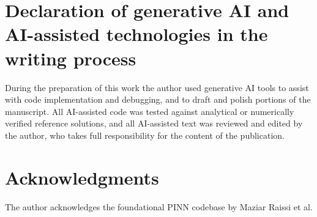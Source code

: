 \documentclass[a4paper,fleqn]{cas-sc}
\begin{document}
\section*{Declaration of generative AI and AI-assisted technologies in the writing process}

During the preparation of this work the author used generative AI tools to
assist with code implementation and debugging, and to draft and polish
portions of the manuscript. All AI-assisted code was tested against analytical
or numerically verified reference solutions, and all AI-assisted text was
reviewed and edited by the author, who takes full responsibility for the
content of the publication.

\section*{Acknowledgments}

The author acknowledges the foundational PINN codebase by Maziar Raissi et al.

\printcredits



\end{document}
